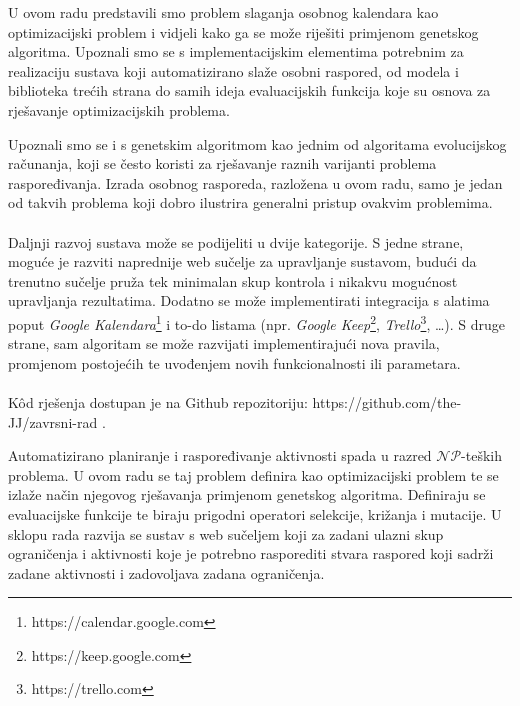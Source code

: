 \documentclass[times, utf8, zavrsni]{fer}
\begin{document}
U ovom radu predstavili smo problem slaganja osobnog kalendara kao optimizacijski problem i vidjeli kako ga se može riješiti primjenom genetskog algoritma. Upoznali smo se s implementacijskim elementima potrebnim za realizaciju sustava koji automatizirano slaže osobni raspored, od modela i biblioteka trećih strana do samih ideja evaluacijskih funkcija koje su osnova za rješavanje optimizacijskih problema.

Upoznali smo se i s genetskim algoritmom kao jednim od algoritama evolucijskog računanja, koji se često koristi za rješavanje raznih varijanti problema raspoređivanja. Izrada osobnog rasporeda, razložena u ovom radu, samo je jedan od takvih problema koji dobro ilustrira generalni pristup ovakvim problemima.

\paragraph{}
Daljnji razvoj sustava može se podijeliti u dvije kategorije. S jedne strane, moguće je razviti naprednije web sučelje za upravljanje sustavom, budući da trenutno sučelje pruža tek minimalan skup kontrola i nikakvu mogućnost upravljanja rezultatima. Dodatno se može implementirati integracija s alatima poput \textit{Google Kalendara}\footnote{https://calendar.google.com} i to-do listama (npr. \textit{Google Keep}\footnote{https://keep.google.com}, \textit{Trello}\footnote{https://trello.com}, \dots). S druge strane, sam algoritam se može razvijati implementirajući nova pravila, promjenom postojećih te uvođenjem novih funkcionalnosti ili parametara.

\paragraph{}
K\^{o}d rješenja dostupan je na Github repozitoriju: https://github.com/the-JJ/zavrsni-rad .





\begin{sazetak}
Automatizirano planiranje i raspoređivanje aktivnosti spada u razred $\mathcal{NP}$-teških problema. U ovom radu se taj problem definira kao optimizacijski problem te se izlaže način njegovog rješavanja primjenom genetskog algoritma. Definiraju se evaluacijske funkcije te biraju prigodni operatori selekcije, križanja i mutacije. U sklopu rada razvija se sustav s web sučeljem koji za zadani ulazni skup ograničenja i aktivnosti koje je potrebno rasporediti stvara raspored koji sadrži zadane aktivnosti i zadovoljava zadana ograničenja.

\end{sazetak}
\end{document}
